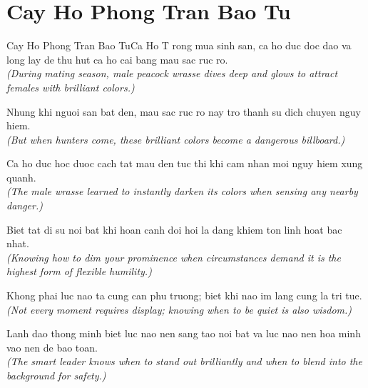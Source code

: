 \section{Cay Ho Phong Tran Bao Tu}
\begin{truyen}{Cay Ho Phong Tran Bao Tu}{Ca Ho}
T rong mua sinh san, ca ho duc doc dao va long lay de thu hut ca ho cai bang mau sac ruc ro.\\
\textit{(During mating season, male peacock wrasse dives deep and glows to attract females with brilliant colors.)}

Nhung khi nguoi san bat den, mau sac ruc ro nay tro thanh su dich chuyen nguy hiem.\\
\textit{(But when hunters come, these brilliant colors become a dangerous billboard.)}

Ca ho duc hoc duoc cach tat mau den tuc thi khi cam nhan moi nguy hiem xung quanh.\\
\textit{(The male wrasse learned to instantly darken its colors when sensing any nearby danger.)}

Biet tat di su noi bat khi hoan canh doi hoi la dang khiem ton linh hoat bac nhat.\\
\textit{(Knowing how to dim your prominence when circumstances demand it is the highest form of flexible humility.)}

Khong phai luc nao ta cung can phu truong; biet khi nao im lang cung la tri tue.\\
\textit{(Not every moment requires display; knowing when to be quiet is also wisdom.)}

\end{truyen}
\begin{baihoc}
  Lanh dao thong minh biet luc nao nen sang tao noi bat va luc nao nen hoa minh vao nen de bao toan.\\
  \textit{(The smart leader knows when to stand out brilliantly and when to blend into the background for safety.)}
\end{baihoc}

